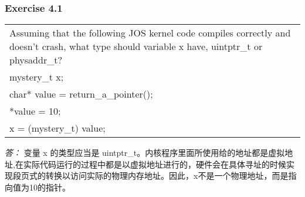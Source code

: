 \documentclass[11pt,a4paper]{article}
\begin{document}
\subsubsection{Exercise 4.1}
\begin{tabular}{|p{\textwidth}|}
\hline
Assuming that the following JOS kernel code compiles correctly and doesn't crash, what type should variable x have, uintptr\_t or physaddr\_t?\\
\hspace{2em}mystery\_t x;\\
\hspace{2em}char* value = return\_a\_pointer();\\
\hspace{2em}*value = 10;\\
\hspace{2em}x = (mystery\_t) value;\\
\hline
\end{tabular}
\textit{\large{答：}}
变量 x 的类型应当是 uintptr\_t。内核程序里面所使用给的地址都是虚拟地址,在实际代码运行的过程中都是以虚拟地址进行的，硬件会在具体寻址的时候实现段页式的转换以访问实际的物理内存地址。因此，x不是一个物理地址，而是指向值为10的指针。\\
\end{document}
